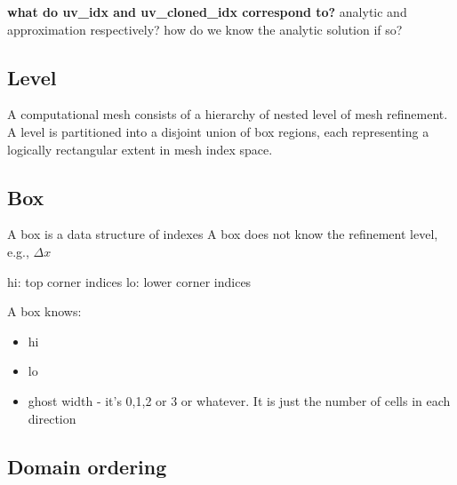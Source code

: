 \documentclass[12pt,a4paper,twoside]{article}
\begin{document}
{\textbf{\color{red}what do uv\_idx and uv\_cloned\_idx correspond to?} analytic and approximation respectively? how do we know the analytic solution if so?}

\subsection{Level}
A computational mesh consists of a hierarchy of nested level of mesh refinement. A level is partitioned into a disjoint union of box regions, each representing a logically rectangular extent in mesh index space. 

\subsection{Box}
A box is a data structure of indexes
A box does not know the refinement level, e.g., $\Delta x$

hi: top corner indices
lo: lower corner indices

A box knows: 
\begin{itemize}
    \item hi
    \item lo
    \item ghost width - it's 0,1,2 or 3 or whatever. It is just the number of cells in each direction 
\end{itemize}

\subsection{Domain ordering}


\end{document}
